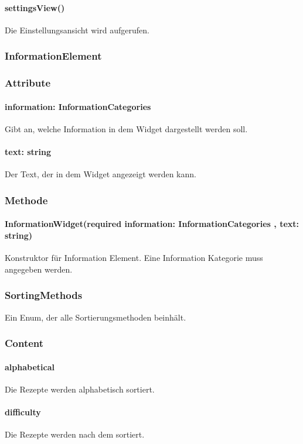\documentclass{entwurfsheft}
\begin{document}
\paragraph*{settingsView()} Die Einstellungsansicht wird aufgerufen.


\subsubsection{InformationElement}\label{sec:InformationElement}
\subsubsection*{Attribute}
\paragraph*{information: InformationCategories} Gibt an, welche Information in dem Widget dargestellt werden soll.
\paragraph*{text: string} Der Text, der in dem Widget angezeigt werden kann.

\subsubsection*{Methode}
\paragraph*{InformationWidget(required information: InformationCategories , text: string)} Konstruktor für Information Element. Eine Information Kategorie muss angegeben werden.


\subsubsection{SortingMethods}\label{sec:SortingMethods}
Ein Enum, der alle Sortierungsmethoden beinhält.
\subsubsection*{Content}
\paragraph*{alphabetical} Die Rezepte werden alphabetisch sortiert.
\paragraph*{difficulty} Die Rezepte werden nach dem  sortiert.
\end{document}
